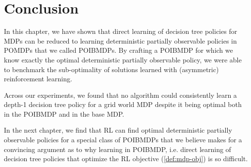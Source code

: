 \section{Conclusion}
In this chapter, we have shown that direct learning of decision tree policies for MDPs can be reduced to learning deterministic partially observable policies in POMDPs that we called POIBMDPs.
By crafting a POIBMDP for which we know exactly the optimal deterministic partially observable policy, we were able to benchmark the sub-optimality of solutions learned with (asymmetric) reinforcement learning.

Across our experiments, we found that no algorithm could consistently learn a depth-1 decision tree policy for a grid world MDP despite it being optimal both in the POIBMDP and in the base MDP.

In the next chapter, we find that RL can find optimal deterministic partially observable policies for a special class of POIBMDPs that we believe makes for a convincing argument as to why learning in POIBMDP, i.e. direct learning of decision tree policies that optimize the RL objective (\ref{def:mdp-obj}) is so difficult.
